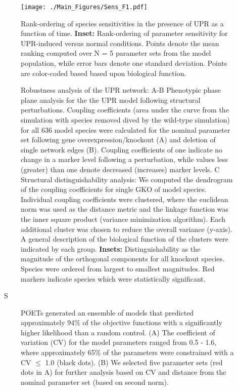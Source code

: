 \begin{figure}\centering
\texttt{[image: ./Main\_Figures/Sens\_F1.pdf]}
	\caption{Rank-ordering of species sensitivities in the presence of UPR as a function of time.
	\textbf{Inset:} Rank-ordering of parameter sensitivity for UPR-induced versus normal conditions.
Points denote the mean ranking computed over N = 5 parameter sets from the model population, while error bars denote one standard deviation. Points are color-coded based based upon biological function.}
	\label{fg:fig5}
\end{figure}

\begin{figure}\centering
{}
	\caption{Robustness analysis of the UPR network: A-B Phenotypic phase plane analysis for the the UPR model following structural perturbations. Coupling coefficients (area under the curve from the simulation with species removed dived by the wild-type simulation) for all 636 model species were calculated for the nominal parameter set following gene overexpression/knockout (A) and deletion of single network edges (B). Coupling coefficients of one indicate no change in a marker level following a perturbation, while values less (greater) than one denote decreased (increases) marker levels. C Structural distinguishability analysis: We computed the dendrogram of the coupling coefficients for single GKO of model species. Individual coupling coefficients were clustered, where the euclidean norm was used as the distance metric and the linkage function was the inner square product (variance minimization algorithm). Each additional cluster was chosen to reduce the overall variance (y-axis). A general description of the biological function of the clusters were indicated by each group. \textbf{Insets:} Distinguishability as the magnitude of the orthogonal components for all knockout species.  Species were ordered from largest to smallest magnitudes.  Red markers indicate species which were statistically significant.}
	\label{fg:robustness_figure}
\end{figure}


\setcounter{figure}{0}
\makeatletter
\makeatletter \renewcommand{\fnum@figure}
{\figurename~S\thefigure}
\makeatother


\begin{figure}\centering
	\caption{ POETs generated an ensemble of models that predicted approximately 94\% of the objective functions with a significantly higher likelihood than a random control. (A) The coefficient of variation (CV) for the model parameters ranged from 0.5 - 1.6, where approximately 65\% of the parameters were constrained with a CV $\leq$ 1.0 (black dots). (B) We selected five parameter sets (red dots in A) for further analysis based on CV and distance from the nominal parameter set (based on second norm).}
	\label{fg:Para_S1}
\end{figure}

